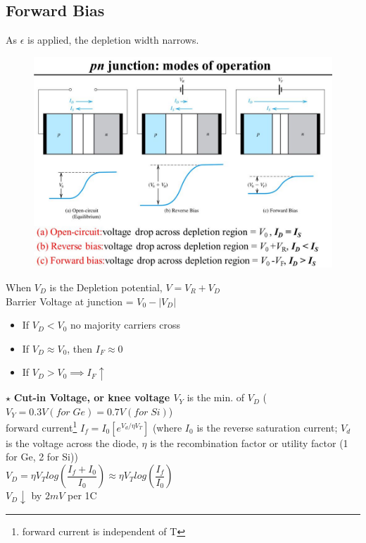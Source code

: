 \documentclass[10pt, a4paper]{report}
\begin{document}
	\subsection{Forward Bias}
	As $\epsilon$ is applied, the depletion width narrows.
	\begin{figure}[h!]
		\centering
		\includegraphics[width=0.7\linewidth]{img/potential-across-diode}
		\caption{}
		\label{fig:potential-across-diode}
	\end{figure}
	When $ V_D $ is the Depletion potential, $ V = V_R + V_D $\\Barrier Voltage at junction = $ V_0 - |V_D| $
	\begin{itemize}
		\item If $ V_D < V_0 $ no majority carriers cross
		\item If $ V_D \approx V_0 $, then  $ I_F \approx 0 $
		\item If $ V_D > V_0 \implies I_F  \uparrow$ 
	\end{itemize}
	$\star$ \textbf{Cut-in Voltage, or knee voltage $ V_Y $} is the min. of $ V_D $ ($ V_Y = 0.3V(for \; Ge) =0.7V(for \; Si) $) \\
	forward current\footnote{forward current is independent of T} $ I_f = I_0[ e^{V_d/\eta V_T}] $ (where $ I_0 $ is the reverse saturation current; $ V_d $ is the voltage across the diode, $\eta$ is the recombination factor or utility factor (1 for Ge, 2 for Si)) \\
	$ V_D = \eta V_T log(\dfrac{I_f+I_0}{I_0}) \approx \eta V_T log(\dfrac{I_f}{I_0}) $ \\
	$ V_D \downarrow $ by $ 2 mV $ per 1C
	
\end{document}
